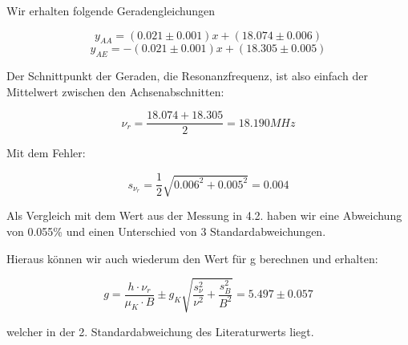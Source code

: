 Wir erhalten folgende Geradengleichungen

$$ y_{AA} = (0.021 \pm 0.001)x + (18.074 \pm 0.006) $$
$$ y_{AE} = -(0.021 \pm 0.001)x + (18.305 \pm 0.005) $$

Der Schnittpunkt der Geraden, die Resonanzfrequenz, ist also einfach der Mittelwert zwischen den Achsenabschnitten:

$$ \boxed{\nu_r = \frac{18.074 + 18.305}{2} = 18.190 MHz} $$

Mit dem Fehler:

$$s_{\nu_r} = \frac{1}{2}\sqrt{0.006^2 + 0.005^2} = 0.004$$

Als Vergleich mit dem Wert aus der Messung in 4.2. haben wir eine Abweichung von 0.055\% und einen Unterschied von 3 Standardabweichungen.

Hieraus können wir auch wiederum den Wert für g berechnen und erhalten:

$$ g = \frac{h\cdot\nu_r}{\mu_K\cdot B} \pm g_K\sqrt{\frac{s_\nu^2}{\nu^2} + \frac{s_B^2}{B^2}} = 5.497 \pm 0.057 $$ 

welcher in der 2. Standardabweichung des Literaturwerts liegt.













